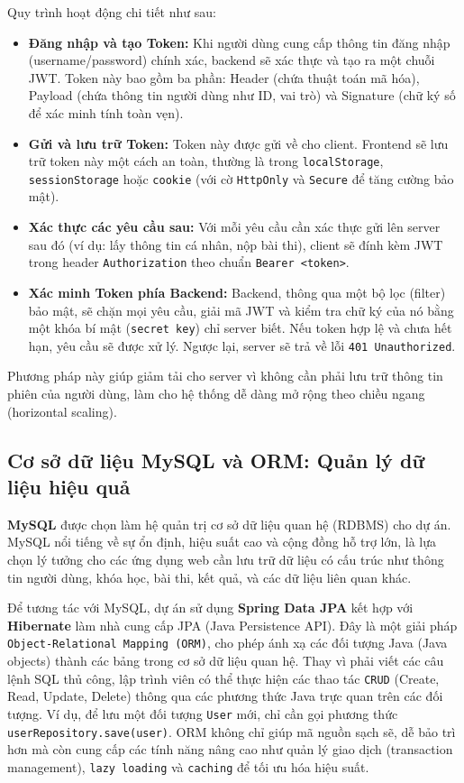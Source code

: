 \documentclass[../DoAn.tex]{subfiles}
\begin{document}
Quy trình hoạt động chi tiết như sau:
\begin{itemize}
    \item \textbf{Đăng nhập và tạo Token:} Khi người dùng cung cấp thông tin đăng nhập (username/password) chính xác, backend sẽ xác thực và tạo ra một chuỗi JWT. Token này bao gồm ba phần: Header (chứa thuật toán mã hóa), Payload (chứa thông tin người dùng như ID, vai trò) và Signature (chữ ký số để xác minh tính toàn vẹn).
    \item \textbf{Gửi và lưu trữ Token:} Token này được gửi về cho client. Frontend sẽ lưu trữ token này một cách an toàn, thường là trong \texttt{localStorage}, \texttt{sessionStorage} hoặc \texttt{cookie} (với cờ \texttt{HttpOnly} và \texttt{Secure} để tăng cường bảo mật).
    \item \textbf{Xác thực các yêu cầu sau:} Với mỗi yêu cầu cần xác thực gửi lên server sau đó (ví dụ: lấy thông tin cá nhân, nộp bài thi), client sẽ đính kèm JWT trong header \texttt{Authorization} theo chuẩn \texttt{Bearer <token>}.
    \item \textbf{Xác minh Token phía Backend:} Backend, thông qua một bộ lọc (filter) bảo mật, sẽ chặn mọi yêu cầu, giải mã JWT và kiểm tra chữ ký của nó bằng một khóa bí mật (\texttt{secret key}) chỉ server biết. Nếu token hợp lệ và chưa hết hạn, yêu cầu sẽ được xử lý. Ngược lại, server sẽ trả về lỗi \texttt{401 Unauthorized}.
\end{itemize}

Phương pháp này giúp giảm tải cho server vì không cần phải lưu trữ thông tin phiên của người dùng, làm cho hệ thống dễ dàng mở rộng theo chiều ngang (horizontal scaling).

\subsection{Cơ sở dữ liệu MySQL và ORM: Quản lý dữ liệu hiệu quả}

\textbf{MySQL} được chọn làm hệ quản trị cơ sở dữ liệu quan hệ (RDBMS) cho dự án. MySQL nổi tiếng về sự ổn định, hiệu suất cao và cộng đồng hỗ trợ lớn, là lựa chọn lý tưởng cho các ứng dụng web cần lưu trữ dữ liệu có cấu trúc như thông tin người dùng, khóa học, bài thi, kết quả, và các dữ liệu liên quan khác.

Để tương tác với MySQL, dự án sử dụng \textbf{Spring Data JPA} kết hợp với \textbf{Hibernate} làm nhà cung cấp JPA (Java Persistence API). Đây là một giải pháp \texttt{Object-Relational Mapping (ORM)}, cho phép ánh xạ các đối tượng Java (Java objects) thành các bảng trong cơ sở dữ liệu quan hệ. Thay vì phải viết các câu lệnh SQL thủ công, lập trình viên có thể thực hiện các thao tác \texttt{CRUD} (Create, Read, Update, Delete) thông qua các phương thức Java trực quan trên các đối tượng. Ví dụ, để lưu một đối tượng \texttt{User} mới, chỉ cần gọi phương thức \texttt{userRepository.save(user)}. ORM không chỉ giúp mã nguồn sạch sẽ, dễ bảo trì hơn mà còn cung cấp các tính năng nâng cao như quản lý giao dịch (transaction management), \texttt{lazy loading} và \texttt{caching} để tối ưu hóa hiệu suất.
\end{document}
